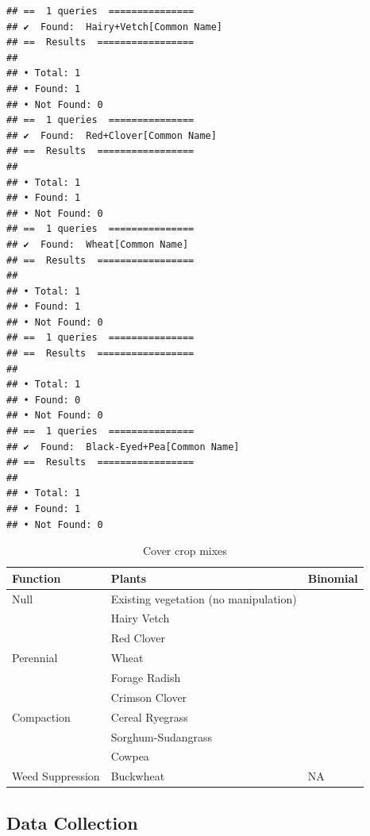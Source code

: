 \documentclass[
]{article}
\begin{document}
\begin{verbatim}
## ==  1 queries  ===============
## ✔  Found:  Hairy+Vetch[Common Name]
## ==  Results  =================
## 
## • Total: 1 
## • Found: 1 
## • Not Found: 0
## ==  1 queries  ===============
## ✔  Found:  Red+Clover[Common Name]
## ==  Results  =================
## 
## • Total: 1 
## • Found: 1 
## • Not Found: 0
## ==  1 queries  ===============
## ✔  Found:  Wheat[Common Name]
## ==  Results  =================
## 
## • Total: 1 
## • Found: 1 
## • Not Found: 0
## ==  1 queries  ===============
## ==  Results  =================
## 
## • Total: 1 
## • Found: 0 
## • Not Found: 0
## ==  1 queries  ===============
## ✔  Found:  Black-Eyed+Pea[Common Name]
## ==  Results  =================
## 
## • Total: 1 
## • Found: 1 
## • Not Found: 0
\end{verbatim}

\begin{table}

\caption{\label{tab:crops}Cover crop mixes}
\centering
\begin{tabular}[t]{l|l|l}
\hline
Function & Plants & Binomial\\
\hline
Null & Existing vegetation (no manipulation) & \\
\cline{1-2}
 & Hairy Vetch & \\
\cline{2-2}
 & Red Clover & \\
\cline{2-2}
\multirow{-3}{*}{\raggedright\arraybackslash Perennial} & Wheat & \\
\cline{1-2}
 & Forage Radish & \\
\cline{2-2}
 & Crimson Clover & \\
\cline{2-2}
\multirow{-3}{*}{\raggedright\arraybackslash Compaction} & Cereal Ryegrass & \\
\cline{1-2}
 & Sorghum-Sudangrass & \\
\cline{2-2}
 & Cowpea & \\
\cline{2-2}
\multirow{-3}{*}{\raggedright\arraybackslash Weed Suppression} & Buckwheat & \multirow{-10}{*}{\raggedright\arraybackslash NA}\\
\hline
\end{tabular}
\end{table}

\hypertarget{data-collection}{%
\subsection{Data Collection}\label{data-collection}}
\end{document}
